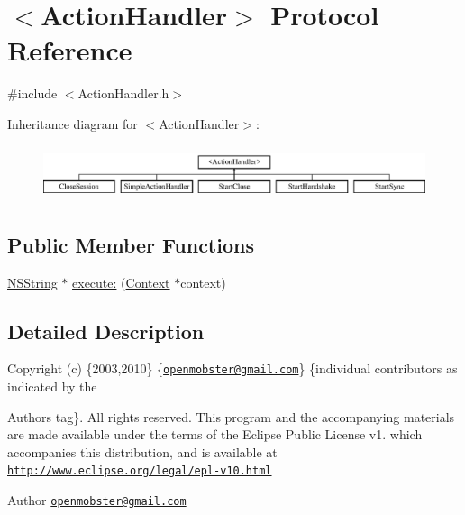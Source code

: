 \hypertarget{protocol_action_handler-p}{
\section{$<$\-Action\-Handler$>$ \-Protocol \-Reference}
\label{protocol_action_handler-p}
}


{\ttfamily \#include $<$\-Action\-Handler.\-h$>$}

\-Inheritance diagram for $<$\-Action\-Handler$>$\-:\begin{figure}[H]
\begin{center}
\leavevmode
\includegraphics[height=1.623188cm]{protocol_action_handler-p}
\end{center}
\end{figure}
\subsection*{\-Public \-Member \-Functions}
\begin{DoxyCompactItemize}
\item 
\hyperlink{class_n_s_string}{\-N\-S\-String} $\ast$ \hyperlink{protocol_action_handler-p_a9480251a45c8bf8973bbd34f873c443f}{execute\-:} (\hyperlink{interface_context}{\-Context} $\ast$context)
\end{DoxyCompactItemize}


\subsection{\-Detailed \-Description}
\-Copyright (c) \{2003,2010\} \{\href{mailto:openmobster@gmail.com}{\tt openmobster@gmail.\-com}\} \{individual contributors as indicated by the \begin{DoxyAuthor}{\-Authors}
tag\}. \-All rights reserved. \-This program and the accompanying materials are made available under the terms of the \-Eclipse \-Public \-License v1. which accompanies this distribution, and is available at \href{http://www.eclipse.org/legal/epl-v10.html}{\tt http\-://www.\-eclipse.\-org/legal/epl-\/v10.\-html}
\end{DoxyAuthor}
\begin{DoxyAuthor}{\-Author}
\href{mailto:openmobster@gmail.com}{\tt openmobster@gmail.\-com} 
\end{DoxyAuthor}


